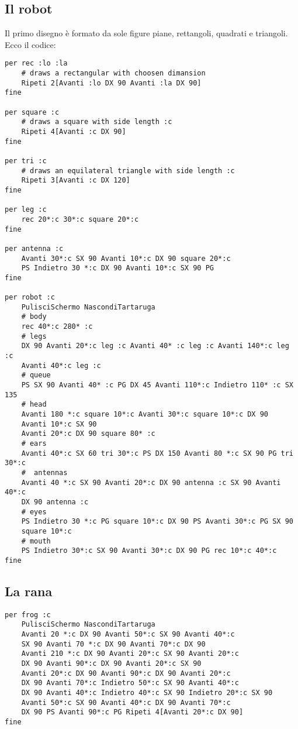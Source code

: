 \subsection{Il robot}
Il primo disegno è formato da sole figure piane, rettangoli, quadrati e triangoli. Ecco il codice:
\begin{lstlisting}
per rec :lo :la
	# draws a rectangular with choosen dimansion
	Ripeti 2[Avanti :lo DX 90 Avanti :la DX 90]
fine

per square :c
	# draws a square with side length :c
	Ripeti 4[Avanti :c DX 90]
fine

per tri :c
	# draws an equilateral triangle with side length :c
	Ripeti 3[Avanti :c DX 120]
fine

per leg :c
	rec 20*:c 30*:c square 20*:c
fine

per antenna :c
	Avanti 30*:c SX 90 Avanti 10*:c DX 90 square 20*:c
	PS Indietro 30 *:c DX 90 Avanti 10*:c SX 90 PG
fine

per robot :c
	PulisciSchermo NascondiTartaruga
	# body
	rec 40*:c 280* :c
	# legs
	DX 90 Avanti 20*:c leg :c Avanti 40* :c leg :c Avanti 140*:c leg :c 
	Avanti 40*:c leg :c
	# queue
	PS SX 90 Avanti 40* :c PG DX 45 Avanti 110*:c Indietro 110* :c SX 135
	# head
	Avanti 180 *:c square 10*:c Avanti 30*:c square 10*:c DX 90 
	Avanti 10*:c SX 90
	Avanti 20*:c DX 90 square 80* :c
	# ears
	Avanti 40*:c SX 60 tri 30*:c PS DX 150 Avanti 80 *:c SX 90 PG tri 30*:c
	#  antennas
	Avanti 40 *:c SX 90 Avanti 20*:c DX 90 antenna :c SX 90 Avanti 40*:c 
	DX 90 antenna :c
	# eyes 
	PS Indietro 30 *:c PG square 10*:c DX 90 PS Avanti 30*:c PG SX 90 
	square 10*:c
	# mouth
	PS Indietro 30*:c SX 90 Avanti 30*:c DX 90 PG rec 10*:c 40*:c
fine
\end{lstlisting}


\subsection{La rana}
\begin{lstlisting}
per frog :c
	PulisciSchermo NascondiTartaruga
	Avanti 20 *:c DX 90 Avanti 50*:c SX 90 Avanti 40*:c 
	SX 90 Avanti 70 *:c DX 90 Avanti 70*:c DX 90
	Avanti 210 *:c DX 90 Avanti 20*:c SX 90 Avanti 20*:c 
	DX 90 Avanti 90*:c DX 90 Avanti 20*:c SX 90
	Avanti 20*:c DX 90 Avanti 90*:c DX 90 Avanti 20*:c 
	DX 90 Avanti 70*:c Indietro 50*:c SX 90 Avanti 40*:c 
	DX 90 Avanti 40*:c Indietro 40*:c SX 90 Indietro 20*:c SX 90 
	Avanti 50*:c SX 90 Avanti 40*:c DX 90 Avanti 70*:c 
	DX 90 PS Avanti 90*:c PG Ripeti 4[Avanti 20*:c DX 90]
fine
\end{lstlisting}

